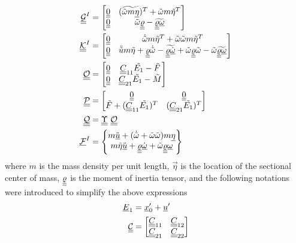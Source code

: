 \begin{align}
        \label{mathcalG}
        \underline{\underline{\mathcal{G}}}^I &= \begin{bmatrix}
        \underline{\underline{0}} & (\widetilde{\tilde{\omega} m \underline{\eta}})^T+\tilde{\omega} m \tilde{\eta}^T  \\
        \underline{\underline{0}} & \tilde{\omega} \underline{\underline{\varrho}}-\widetilde{\underline{\underline{\varrho}} \underline{\omega}}
        \end{bmatrix} \\
        \label{mathcalK}
        \underline{\underline{\mathcal{K}}}^I &= \begin{bmatrix}
        \underline{\underline{0}} & \dot{\tilde{\omega}}m\tilde{\eta}^T + \tilde{\omega} \tilde{\omega}m\tilde{\eta}^T  \\
        \underline{\underline{0}} & \ddot{\tilde{u}}m\tilde{\eta} + \underline{\underline{\varrho}} \dot{\tilde{\omega}}-\widetilde{\underline{\underline{\varrho}} \underline{\dot{\omega}}}+\tilde{\omega} \underline{\underline{\varrho}} \tilde{\omega} - \tilde{\omega}  \widetilde{\underline{\underline{\varrho}} \underline{\omega}}
        \end{bmatrix}\\
	\label{mathcalO}
	\mathcal{\underline{\underline{O}}} &= \begin{bmatrix}
	\underline{\underline{0}} & \underline{\underline{C}}_{11} \tilde{E_1} - \tilde{F} \\
	\underline{\underline{0}}& \underline{\underline{C}}_{21} \tilde{E_1} - \tilde{M}
	\end{bmatrix} \\
	\label{mathcalP}
	\mathcal{\underline{\underline{P}}} &= \begin{bmatrix}
	\underline{\underline{0}} & \underline{\underline{0}} \\
	\tilde{F} +  (\underline{\underline{C}}_{11} \tilde{E_1})^T & (\underline{\underline{C}}_{21} \tilde{E_1})^T
	\end{bmatrix}  \\
	\label{mathcalQ}
	\mathcal{\underline{\underline{Q}}} &= \underline{\underline{\Upsilon}}~ \mathcal{\underline{\underline{O}}} \\
	\label{mathcalFI}
	\underline{\mathcal{F}}^I &= \begin{Bmatrix}
	m \ddot{\underline{u}} + (\dot{\tilde{\omega}} + \tilde{\omega} \tilde{\omega})m \underline{\eta} \\
	m \tilde{\eta} \ddot{\underline{u}} +\underline{\underline{\varrho}}\dot{\underline{\omega}}+\tilde{\omega}\underline{\underline{\varrho}}\underline{\omega}
	\end{Bmatrix}
\end{align}
where $m$ is the mass density per unit length, $\vec{\eta}$ is the location of the sectional center of mass, $\underline{\underline{\varrho}}$ is the moment of inertia tensor, and the following notations were introduced to simplify the above expressions
\begin{align}
    \label{E1}
    \underline{E}_1 &= \underline{x}_0^\prime + \underline{u}^\prime \\
    \label{PartC}
    \underline{\underline{\mathcal{C}}} &= \begin{bmatrix}
    \underline{\underline{C}}_{11} & \underline{\underline{C}}_{12} \\
    \underline{\underline{C}}_{21} & \underline{\underline{C}}_{22}
    \end{bmatrix}
\end{align}

